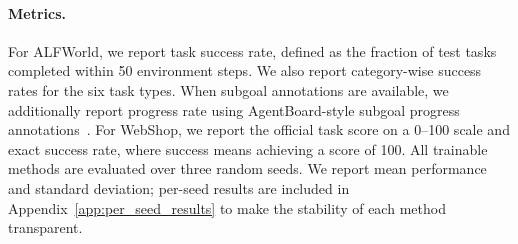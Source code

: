 \documentclass{article}
\begin{document}
\paragraph{Metrics.}
For ALFWorld, we report task success rate, defined as the fraction of test tasks completed within 50 environment steps. We also report category-wise success rates for the six task types. When subgoal annotations are available, we additionally report progress rate using AgentBoard-style subgoal progress annotations~\cite{ma2024agentboard}. For WebShop, we report the official task score on a 0--100 scale and exact success rate, where success means achieving a score of 100. All trainable methods are evaluated over three random seeds. We report mean performance and standard deviation; per-seed results are included in Appendix~\ref{app:per_seed_results} to make the stability of each method transparent.
\end{document}
